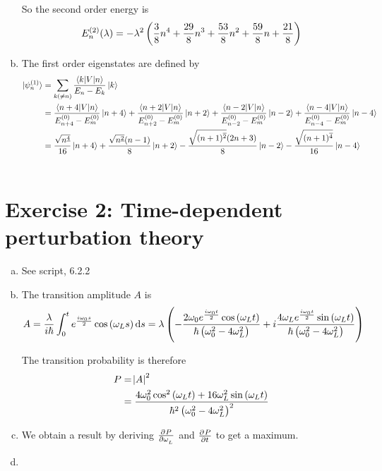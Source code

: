 \documentclass[a4paper,german,12pt,smallheadings]{scrartcl}
\begin{document}
\begin{enumerate}[a)]
    So the second order energy is
    \begin{equation*}
      E_n^{(2)}(\lambda)  = -\lambda^2 \del{\frac{3}{8}n^4 + \frac{29}{8}n^3 + \frac{53}{8}n^2 + \frac{59}{8} n + \frac{21}{8}}
    \end{equation*}

  \item
    The first order eigenstates are defined by
    \begin{align*}
      \ket{\psi_n^{(1)}} &= \sum_{k (\neq n)} \frac{\braket{k|V|n}}{E_n - E_k} \ket{k} \\
      &=
      \frac{\braket{n+4|V|n}}{E^{(0)}_{n+4} - E^{(0)}_{m}} \ket{n+4} +
      \frac{\braket{n+2|V|n}}{E^{(0)}_{n+2} - E^{(0)}_{m}} \ket{n+2} +
      \frac{\braket{n-2|V|n}}{E^{(0)}_{n-2} - E^{(0)}_{m}} \ket{n-2} +
      \frac{\braket{n-4|V|n}}{E^{(0)}_{n-4} - E^{(0)}_{m}} \ket{n-4} \\
      &= 
      \frac{\sqrt{n^{\underline 4}}}{16} \ket{n+4}
      +\frac{\sqrt{n^{\underline 2}}(n-1)}{8} \ket{n+2}
      -\frac{\sqrt{(n+1)^{\overline 2}}(2n+3)}{8} \ket{n-2}
      -\frac{\sqrt{(n+1)^{\overline 4}}}{16} \ket{n-4} \\\
    \end{align*}

\end{enumerate}

\section*{Exercise 2: Time-dependent perturbation theory}
\begin{enumerate}[a)]
  \item
    See script, 6.2.2
  \item
    The transition amplitude $A$ is
    \begin{align*}
      A = \frac{\lambda}{i \hbar} \int_0^t e^{\frac{i \omega_0 s}{2}} \cos \del{\omega_L s} \dif s =
      \lambda
      \del{
        -\frac{2 \omega_0 e^\frac{i \omega_0 t}{2} \cos\del{\omega_L t}}{\hbar\del{\omega_0^2 - 4 \omega_L^2}}
        +i\frac{4 \omega_L e^\frac{i \omega_0 t}{2} \sin\del{\omega_L t}}{\hbar\del{\omega_0^2 - 4 \omega_L^2}}
      }
    \end{align*}

    The transition probability is therefore
    \begin{align*}
      P &= \envert{A}^2 \\
       &= \frac{4 \omega_0^2 \cos^2\del{\omega_L t} + 16 \omega_L^2 \sin\del{\omega_L t}}{\hbar^2\del{\omega_0^2 - 4 \omega_L^2}^2}
    \end{align*}
  \item
    We obtain a result by deriving $\pd{P}{\omega_L}$ and $\pd{P}{t}$ to get a maximum.
  \item
\end{enumerate}
\end{document}
